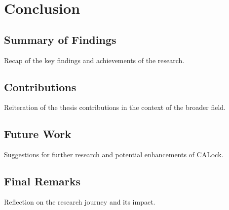 %

\chapter{Conclusion}
\section{Summary of Findings}
Recap of the key findings and achievements of the research.

\section{Contributions}
Reiteration of the thesis contributions in the context of the broader field.

\section{Future Work}
Suggestions for further research and potential enhancements of CALock.

\section{Final Remarks}
Reflection on the research journey and its impact.

